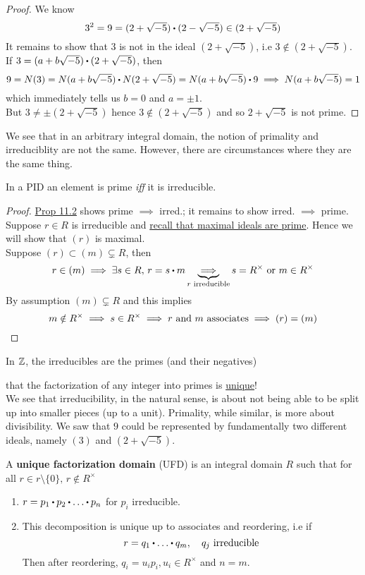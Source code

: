 \documentclass[../Main.tex]{subfiles}
\begin{document}
\begin{proof}
	We know
	\[3^2=9=(2+\sqrt{-5})\rdot (2-\sqrt{-5}) \in (2+\sqrt{-5})\]
	It remains to show that $3$ is not in the ideal $(2+\sqrt{-5})$, i.e $3\notin (2+\sqrt{-5})$.
	If ${3=(a+b\sqrt{-5})\rdot (2+\sqrt{-5})}$, then 
	\[9=N(3)=N(a+b\sqrt{-5})\rdot N(2+\sqrt{-5}) =N(a+b\sqrt{-5})\rdot 9 \implies N(a+b\sqrt{-5}) =1 \]
	which immediately tells us $b=0$ and $a=\pm 1$.\\
	But $3\ne \pm  (2+\sqrt{-5})$ hence $3\notin (2+\sqrt{-5})$ and so $2+\sqrt{-5}$ is not prime.
\end{proof}
We see that in an arbitrary integral domain, the notion of primality and irreduciblity are not the same. However, there are circumstances where they are the same thing.
\begin{prop}[title = Element in PID is prime iff it is irreducible,label =11.3]
	In a PID an element is prime \textit{iff} it is irreducible.
\end{prop}
\begin{proof}
	\hyperref[prop:11.2]{Prop 11.2} shows prime $\implies$ irred.; it remains to show irred. $\implies$ prime.\\
	Suppose $r\in R$ is irreducible and \hyperref[co:7.9]{recall that maximal ideals are prime}. Hence we will show that $(r)$ is maximal.\\
	Suppose $(r)\subset (m)\subsetneq R$, then
	\[r\in (m) \implies \exists s\in R,\, r=s\rdot m \underbrace{\implies}_{r \text{ irreducible} } s=R^\times \text{ or } m\in R^\times\]
	By assumption $(m)\subsetneq R$ and this implies
	\[m\notin R^\times \implies s\in R^\times \implies r \text{ and } m \text{ associates} \implies (r) = (m)\qedhere\]
\end{proof}
\begin{example}
	In $\mathbb{Z}$, the irreducibles are the primes (and their negatives)
\end{example}
\Obs that the factorization of any integer into primes is \underline{unique}!\\
We see that irreducibility, in the natural sense, is about not being able to be split up into smaller pieces (up to a unit). Primality, while similar, is more about divisibility. We saw that $9$ could be represented by fundamentally two different ideals, namely $(3)$ and $(2+\sqrt{-5})$.
\begin{dfn}[title = Unique Factorization Domain]
	A \textbf{unique factorization domain} (UFD) is an integral domain $R$ such that for all $r\in r\setminus \{0\},\, r\notin R^\times$
	\begin{enumerate}
		\item $r=p_1\rdot p_2\rdot \dots\rdot p_n$ for $p_i$ irreducible.
		\item This decomposition is unique up to associates and reordering, i.e if 
		\[r=q_1\rdot \dots \rdot q_m,\quad q_j \text{ irreducible}\]
		Then after reordering, $q_i=u_ip_i, u_i\in R^\times$ and $n=m$.
	\end{enumerate}
\end{dfn}
\end{document}
